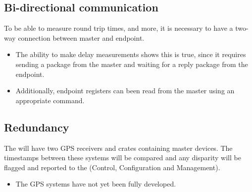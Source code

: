 \documentclass{dune}
\begin{document}


\subsection{Bi-directional communication}
To be able to measure round trip times, and more, it is necessary to have a two-way connection between master and endpoint.
\begin{itemize}
  \item The ability to make delay measurements shows this is true, since it requires sending a package from the master and waiting for a reply package from the endpoint.
  \item Additionally, endpoint registers can been read from the master using an appropriate command.
\end{itemize}

\subsection{Redundancy}
The  will have two GPS receivers and crates containing master devices.
The timestamps between these systems will be compared and any disparity will be flagged and reported to the  (Control, Configuration and Management).
\begin{itemize}
  \item The GPS systems have not yet been fully developed.
\end{itemize}
\end{document}
